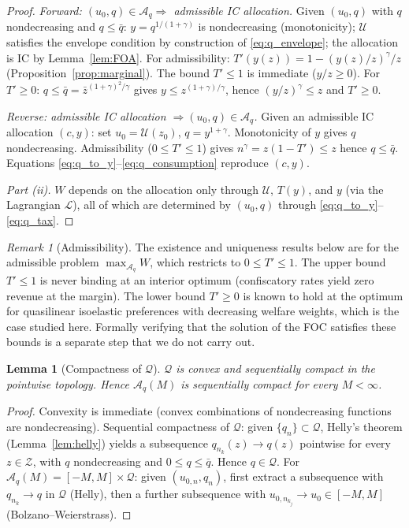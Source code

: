 \documentclass[12pt,a4paper]{article}
\theoremstyle{definition}
\theoremstyle{plain}
\newtheorem{lemma}{Lemma}[section]
\theoremstyle{remark}
\newtheorem{remark}{Remark}[section]
\newcommand{\zbar}{\bar{z}}
\newcommand{\zlow}{z_{\scriptscriptstyle 0}}
\newcommand{\calU}{\mathcal{U}}
\newcommand{\calZ}{\mathcal{Z}}
\newcommand{\calL}{\mathcal{L}}
\newcommand{\calA}{\mathcal{A}}
\begin{document}
\begin{proof}
\emph{Forward: $(u_0, q) \in \calA_q \Rightarrow$
admissible IC allocation.}
Given $(u_0, q)$ with $q$ nondecreasing and
$q \leq \bar q$: $y = q^{1/(1+\gamma)}$ is nondecreasing
(monotonicity); $\calU$ satisfies the envelope condition
by construction of \eqref{eq:q_envelope}; the allocation
is IC by Lemma~\ref{lem:FOA}.  For admissibility:
$T'(y(z)) = 1 - (y(z)/z)^\gamma/z$
(Proposition~\ref{prop:marginal}).  The bound $T' \leq 1$
is immediate ($y/z \geq 0$).  For $T' \geq 0$: $q \leq
\bar q = \zbar^{(1+\gamma)^2/\gamma}$ gives
$y \leq z^{(1+\gamma)/\gamma}$, hence
$(y/z)^\gamma \leq z$ and $T' \geq 0$.

\emph{Reverse: admissible IC allocation $\Rightarrow
(u_0, q) \in \calA_q$.}
Given an admissible IC allocation $(c, y)$: set
$u_0 = \calU(\zlow)$, $q = y^{1+\gamma}$.
Monotonicity of $y$ gives $q$ nondecreasing.
Admissibility ($0 \leq T' \leq 1$) gives
$n^\gamma = z(1-T') \leq z$ hence $q \leq \bar q$.
Equations \eqref{eq:q_to_y}--\eqref{eq:q_consumption}
reproduce $(c, y)$.

\emph{Part (ii).}
$W$ depends on the allocation only through $\calU$,
$T(y)$, and $y$ (via the Lagrangian $\calL$), all of
which are determined by $(u_0, q)$ through
\eqref{eq:q_to_y}--\eqref{eq:q_tax}.
\end{proof}

\begin{remark}[Admissibility]
\label{rem:admissibility}
The existence and uniqueness results below are for the
admissible problem $\max_{\calA_q} W$, which restricts
to $0 \leq T' \leq 1$.  The upper bound $T' \leq 1$ is
never binding at an interior optimum (confiscatory rates
yield zero revenue at the margin).  The lower bound
$T' \geq 0$ is known to hold at the optimum for
quasilinear isoelastic preferences with decreasing
welfare weights, which is the case studied here.
Formally verifying that the solution of the FOC satisfies
these bounds is a separate step that we do not carry out.
\end{remark}

\begin{lemma}[Compactness of $\mathcal{Q}$]
\label{lem:Aq_compact}
$\mathcal{Q}$ is convex and sequentially compact in
the pointwise topology.  Hence $\calA_q(M)$ is
sequentially compact for every $M < \infty$.
\end{lemma}

\begin{proof}
Convexity is immediate (convex combinations of
nondecreasing functions are nondecreasing).
Sequential compactness of $\mathcal{Q}$: given
$\{q_n\} \subset \mathcal{Q}$, Helly's theorem
(Lemma~\ref{lem:helly}) yields a subsequence
$q_{n_k}(z) \to q(z)$ pointwise for every
$z \in \calZ$, with $q$ nondecreasing and
$0 \leq q \leq \bar q$.  Hence $q \in \mathcal{Q}$.
For $\calA_q(M) = [-M,M] \times \mathcal{Q}$: given
$(u_{0,n}, q_n)$, first extract a subsequence with
$q_{n_k} \to q$ in $\mathcal{Q}$ (Helly), then a
further subsequence with $u_{0,n_{k_j}} \to u_0 \in
[-M,M]$ (Bolzano--Weierstrass).
\end{proof}
\end{document}
